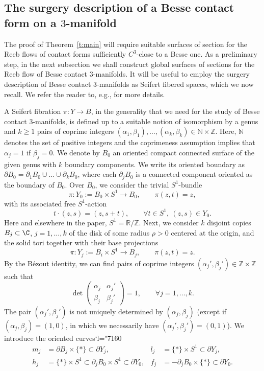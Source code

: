 \documentclass[10pt,a4paper]{amsart}
\newcommand{\Subsection}{\subsection}
\numberwithin{equation}{section}
\let\mathds\mathbb
\newcommand{\Changel}{\mathcode`l="7160}
\theoremstyle{definition}
\newcommand{\N}{\mathds{N}}
\newcommand{\Z}{\mathds{Z}}
\newcommand{\R}{\mathds{R}}
\begin{document}
\Subsection{The surgery description of a Besse contact form on a $3$-manifold}
\label{s:surgery}

The proof of Theorem~\ref{t:main} will require suitable surfaces of section for the Reeb flows of contact forms sufficiently $C^3$-close to a Besse one. As a preliminary step, in the next subsection we shall construct global surfaces of sections for the Reeb flow of Besse contact $3$-manifolds. It will be useful to employ the surgery description of Besse contact $3$-manifolds as Seifert fibered spaces, which we now recall. We refer the reader to, e.g., \cite{Orlik:1972ts,Jankins:1983zm} for more details.

A Seifert fibration $\pi:Y\to B$, in the generality that we need for the study of Besse contact $3$-manifolds, is defined up to a suitable notion of isomorphism by a genus and $k\geq1$ pairs of coprime integers $(\alpha_1,\beta_1),\dots,(\alpha_k,\beta_k)\in\N\times\Z$. Here, $\N$ denotes the set of positive integers and the coprimeness assumption implies that $\alpha_j=1$ if $\beta_j=0$. We denote by $B_0$ an oriented compact connected surface of the given genus with $k$ boundary components. We write its oriented boundary as $\partial B_0=\partial_1 B_0\cup\dots\cup\partial_{k} B_0$, where each $\partial_j B_0$ is a connected component oriented as the boundary of $B_0$. Over $B_0$, we consider the trivial $S^1$-bundle
\[
\pi:Y_0:=B_0\times S^1\to B_0,\qquad \pi(z,t)=z,
\]
with its associated free $S^1$-action
\[
t\cdot(z,s)=(z,s+t),\qquad \forall t\in S^1,\ (z,s)\in Y_0.
\]
Here and elsewhere in the paper, $S^1=\R/\Z$.
Next, we consider $k$ disjoint copies $B_j\subset \C$, $j=1,\dots,k$ of the disk of some radius $\rho>0$ centered at the origin, and the solid tori together with their base projections
\[
\pi:Y_j:=B_i\times S^1\to B_j,\qquad \pi(z,t)=z.
\]
By the Bézout identity, we can find pairs of coprime integers $(\alpha_j',\beta_j')\in \Z\times \Z$ such that
\begin{equation}
\label{e:dual_Seifert_pair}
\det
\begin{pmatrix}
\alpha_j & \alpha_j' \\
\beta_j & \beta_j'
\end{pmatrix}=1,
\qquad
\forall j=1,\dots,k.
\end{equation}
The pair $(\alpha_j',\beta_j')$ is not uniquely determined by $(\alpha_j,\beta_j)$ (except if $(\alpha_j,\beta_j)=(1,0)$, in which we necessarily have $(\alpha_j',\beta_j') = (0,1)$). We introduce the oriented curves\Changel
\begin{align*}
m_j&=\partial B_j\times\{*\}\subset \partial Y_j,
&
l_j&=\{*\}\times S^1 \subset \partial Y_j,
\\
h_j&=\{*\}\times S^1\subset \partial_j B_0\times S^1 \subset\partial Y_0,
&
f_j&=-\partial_j B_0\times\{*\} \subset\partial Y_0.
\end{align*}
\end{document}
